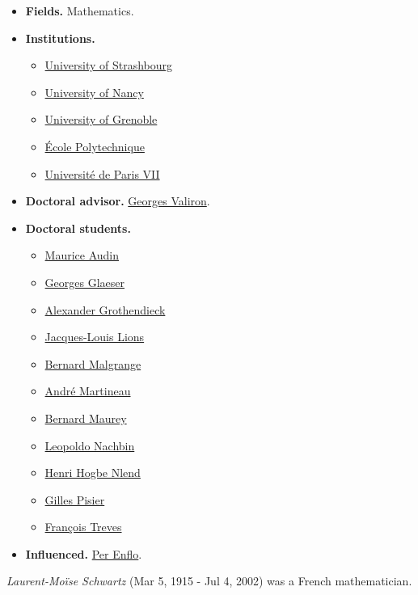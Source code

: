 \documentclass{book}
\numberwithin{equation}{section}
\begin{document}
\begin{itemize}
    \item \textbf{Fields.} Mathematics.
    \item \textbf{Institutions.}
    \begin{itemize}
        \item \href{https://en.wikipedia.org/wiki/University_of_Strasbourg}{University of Strashbourg}
        \item \href{https://en.wikipedia.org/wiki/University_of_Nancy}{University of Nancy}
        \item \href{https://en.wikipedia.org/wiki/University_of_Grenoble}{University of Grenoble}
        \item \href{https://en.wikipedia.org/wiki/%C3%89cole_Polytechnique}{\'Ecole Polytechnique}
        \item \href{https://en.wikipedia.org/wiki/Universit%C3%A9_de_Paris_VII}{Universit\'e de Paris VII}
    \end{itemize}
    \item \textbf{Doctoral advisor.} \href{https://en.wikipedia.org/wiki/Georges_Valiron}{Georges Valiron}.
    \item \textbf{Doctoral students.}
    \begin{itemize}
        \item \href{https://en.wikipedia.org/wiki/Maurice_Audin}{Maurice Audin}
        \item \href{https://en.wikipedia.org/wiki/Georges_Glaeser}{Georges Glaeser}
        \item \href{https://en.wikipedia.org/wiki/Alexander_Grothendieck}{Alexander Grothendieck}
        \item \href{https://en.wikipedia.org/wiki/Jacques-Louis_Lions}{Jacques-Louis Lions}
        \item \href{https://en.wikipedia.org/wiki/Bernard_Malgrange}{Bernard Malgrange}
        \item \href{https://en.wikipedia.org/wiki/Andr%C3%A9_Martineau}{Andr\'e Martineau}
        \item \href{https://en.wikipedia.org/wiki/Bernard_Maurey}{Bernard Maurey}
        \item \href{https://en.wikipedia.org/wiki/Leopoldo_Nachbin}{Leopoldo Nachbin}
        \item \href{https://en.wikipedia.org/wiki/Henri_Hogbe_Nlend}{Henri Hogbe Nlend}
        \item \href{https://en.wikipedia.org/wiki/Gilles_Pisier}{Gilles Pisier}
        \item \href{https://en.wikipedia.org/wiki/Fran%C3%A7ois_Treves}{Fran\c{c}ois Treves}
    \end{itemize}
    \item \textbf{Influenced.} \href{https://en.wikipedia.org/wiki/Per_Enflo}{Per Enflo}.
\end{itemize}
\textit{Laurent-Moïse Schwartz} (Mar 5, 1915 - Jul 4, 2002) was a French mathematician.
\end{document}
